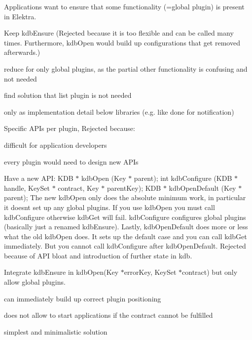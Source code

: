 Applications want to ensure that some functionality (=global plugin) is present in Elektra.


\begin{DoxyItemize}
\item Keep {\ttfamily kdb\+Ensure} (Rejected because it is too flexible and can be called many times. Furthermore, {\ttfamily kdb\+Open} would build up configurations that get removed afterwards.)
\begin{DoxyItemize}
\item reduce for only global plugins, as the partial other functionality is confusing and not needed
\item find solution that list plugin is not needed
\item only as implementation detail below libraries (e.\+g. like done for notification)
\end{DoxyItemize}
\item Specific A\+P\+Is per plugin, Rejected because\+:
\begin{DoxyItemize}
\item difficult for application developers
\item every plugin would need to design new A\+P\+Is
\end{DoxyItemize}
\item Have a new A\+PI\+: {\ttfamily K\+DB $\ast$ kdb\+Open (Key $\ast$ parent);} {\ttfamily int kdb\+Configure (K\+DB $\ast$ handle, Key\+Set $\ast$ contract, Key $\ast$ parent\+Key);} {\ttfamily K\+DB $\ast$ kdb\+Open\+Default (Key $\ast$ parent);} The new kdb\+Open only does the absolute minimum work, in particular it doesn\textquotesingle{}t set up any global plugins. If you use kdb\+Open you must call kdb\+Configure otherwise kdb\+Get will fail. kdb\+Configure configures global plugins (basically just a renamed kdb\+Ensure). Lastly, kdb\+Open\+Default does more or less what the old kdb\+Open does. It sets up the default case and you can call kdb\+Get immediately. But you cannot call kdb\+Configure after kdb\+Open\+Default. Rejected because of A\+PI bloat and introduction of further state in {\ttfamily kdb}.
\end{DoxyItemize}

Integrate {\ttfamily kdb\+Ensure} in {\ttfamily kdb\+Open(\+Key $\ast$error\+Key, Key\+Set $\ast$contract)} but only allow global plugins.


\begin{DoxyItemize}
\item can immediately build up correct plugin positioning
\item does not allow to start applications if the contract cannot be fulfilled
\item simplest and minimalistic solution
\end{DoxyItemize}

